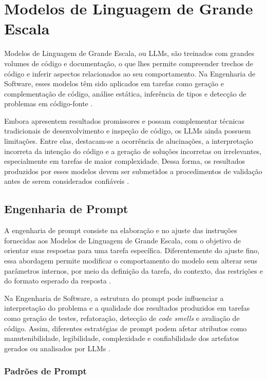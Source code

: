 \section{Modelos de Linguagem de Grande Escala}

Modelos de Linguagem de Grande Escala, ou LLMs, são treinados com grandes volumes de código e documentação, o que lhes permite compreender trechos de código e inferir aspectos relacionados ao seu comportamento. Na Engenharia de Software, esses modelos têm sido aplicados em tarefas como geração e complementação de código, análise estática, inferência de tipos e detecção de problemas em código-fonte \cite{wang2025boosting,VenkateshEtAll,KhojahEtAll}.

Embora apresentem resultados promissores e possam complementar técnicas tradicionais de desenvolvimento e inspeção de código, os LLMs ainda possuem limitações. Entre elas, destacam-se a ocorrência de alucinações, a interpretação incorreta da intenção do código e a geração de soluções incorretas ou irrelevantes, especialmente em tarefas de maior complexidade. Dessa forma, os resultados produzidos por esses modelos devem ser submetidos a procedimentos de validação antes de serem considerados confiáveis \cite{wang2025boosting,VenkateshEtAll,KhojahEtAll}.

\subsection{Engenharia de Prompt}

A engenharia de prompt consiste na elaboração e no ajuste das instruções fornecidas aos Modelos de Linguagem de Grande Escala, com o objetivo de orientar suas respostas para uma tarefa específica. Diferentemente do ajuste fino, essa abordagem permite modificar o comportamento do modelo sem alterar seus parâmetros internos, por meio da definição da tarefa, do contexto, das restrições e do formato esperado da resposta \cite{alomari2026}.

Na Engenharia de Software, a estrutura do prompt pode influenciar a interpretação do problema e a qualidade dos resultados produzidos em tarefas como geração de testes, refatoração, detecção de \textit{code smells} e avaliação de código. Assim, diferentes estratégias de prompt podem afetar atributos como manutenibilidade, legibilidade, complexidade e confiabilidade dos artefatos gerados ou analisados por LLMs \cite{DellaPortaEtAll,OuedraogoEtAll}.

\subsubsection{Padrões de Prompt}

